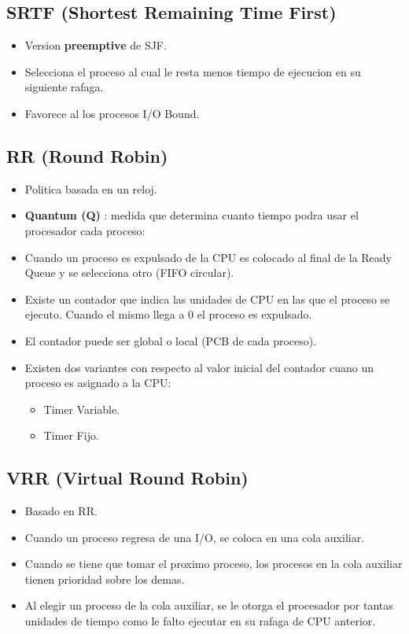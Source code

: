 \documentclass[11pt]{article}
\begin{document}
\subsection{SRTF (Shortest Remaining Time First)}
\begin{itemize}
    \item Version \textbf{preemptive} de SJF.
    \item Selecciona el proceso al cual le resta menos tiempo de ejecucion en su siguiente rafaga.
    \item Favorece al los procesos I/O Bound.
\end{itemize}

\subsection{RR (Round Robin)}
\begin{itemize}
    \item Politica basada en un reloj.
    \item \textbf{Quantum (Q)} : medida que determina cuanto tiempo podra usar el procesador cada proceso:
    \item Cuando un proceso es expulsado de la CPU es colocado al final de la Ready Queue y se selecciona otro (FIFO circular).
    \item Existe un contador que indica las unidades de CPU en las que el proceso se ejecuto. Cuando el mismo llega a 0 el proceso es expulsado.
    \item El contador puede ser global o local (PCB de cada proceso).
    \item Existen dos variantes con respecto al valor inicial del contador cuano un proceso es asignado a la CPU:
        \begin{itemize}
            \item Timer Variable.
            \item Timer Fijo.
        \end{itemize}
\end{itemize}

\subsection{VRR (Virtual Round Robin)}
\begin{itemize}
    \item Basado en RR.
    \item Cuando un proceso regresa de una I/O, se coloca en una cola auxiliar.
    \item Cuando se tiene que tomar el proximo proceso, los procesos en la cola auxiliar tienen prioridad sobre los demas.
    \item Al elegir un proceso de la cola auxiliar, se le otorga el procesador por tantas unidades de tiempo como le falto ejecutar en su rafaga de CPU anterior.
\end{itemize}
\end{document}
